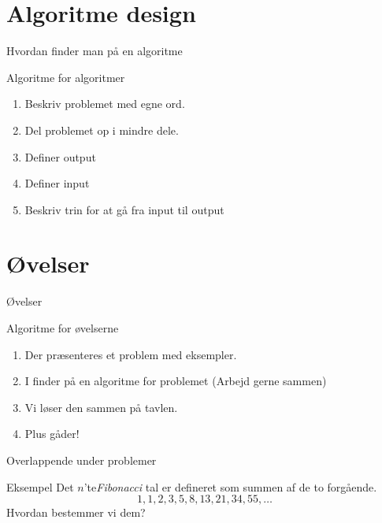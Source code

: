 \documentclass[12pt,t]{beamer}
\begin{document}
\section{Algoritme design}
    \begin{frame}[c]{Hvordan finder man på en algoritme}
        \begin{block}{Algoritme for algoritmer}
            \begin{enumerate}
                \item Beskriv problemet med egne ord. \pause{}
                \item Del problemet op i mindre dele. \pause{}
                \item Definer output \pause{}
                \item Definer input \pause{}
                \item Beskriv trin for at gå fra input til output
            \end{enumerate}
        \end{block}
    \end{frame}


\section{Øvelser}
        \begin{frame}[t]{Øvelser}
            \begin{block}{Algoritme for øvelserne}
                \begin{enumerate}
                    \item Der præsenteres et problem med eksempler. \pause{}
                    \item I finder på en algoritme for problemet
                          (Arbejd gerne sammen) \pause{}
                    \item Vi løser den sammen på tavlen. \pause{}
                    \item Plus gåder!
                \end{enumerate}
            \end{block}
        \end{frame}

        \begin{frame}[c]{Overlappende under problemer}
            \begin{block}{Eksempel}
                Det $n$'te\emph{Fibonacci} tal er defineret som summen af de to
                forgående.
                $$
                  1,1,2,3,5,8,13,21,34,55, \dots
                $$
                \pause
                Hvordan bestemmer vi dem?
            \end{block}
        \end{frame}
\end{document}
